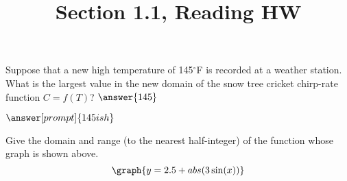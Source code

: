 \documentclass{ximera}
\title{Section 1.1, Reading HW}
\begin{document}
\begin{abstract}
\end{abstract}
\maketitle

\begin{problem}
Suppose that a new high temperature of 145\(^\circ\)F is recorded at a weather station.  What is the largest value in the new domain of the snow tree cricket chirp-rate function \(C=f(T)\)?
    \( \answer{145} \)
    
    \( \answer[prompt]{145ish}\)

\end{problem}

\begin{problem}
   Give the domain and range (to the nearest half-integer) of the function whose graph is shown above.
   \[
    \graph{y= 2.5+ abs(3\sin(x))}
   \]
   
\end{problem}
\end{document}
